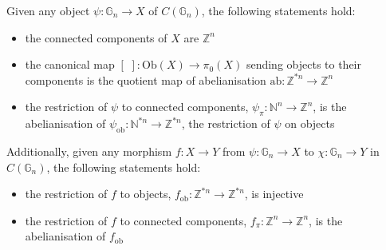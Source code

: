 \begin{lem} Given any object $\psi: \mathbb{G}_n \to X$ of $C(\mathbb{G}_n)$, the following statements hold:
\begin{itemize}
\item the connected components of $X$ are $\mathbb{Z}^n$
\item the canonical map $[ \, \, ]: \mathrm{Ob}(X) \to \pi_0(X)$ sending objects to their components is the quotient map of abelianisation $\mathrm{ab}: \mathbb{Z}^{\ast n} \to \mathbb{Z}^n$
\item the restriction of $\psi$ to connected components, $\psi_\pi: \mathbb{N}^n \to \mathbb{Z}^n$, is the abelianisation of $\psi_{\mathrm{ob}}: \mathbb{N}^{\ast n} \to \mathbb{Z}^{\ast n}$, the restriction of $\psi$ on objects
\end{itemize}
Additionally, given any morphism $f:X \to Y$ from $\psi: \mathbb{G}_n \to X$ to $\chi: \mathbb{G}_n \to Y$ in $C(\mathbb{G}_n)$, the following statements hold:
\begin{itemize}
\item the restriction of $f$ to objects, $f_{\mathrm{ob}}: \mathbb{Z}^{\ast n} \to \mathbb{Z}^{\ast n}$, is injective
\item the restriction of $f$ to connected components, $f_\pi: \mathbb{Z}^n \to \mathbb{Z}^n$, is the abelianisation of $f_{\mathrm{ob}}$
\end{itemize}
\end{lem}
